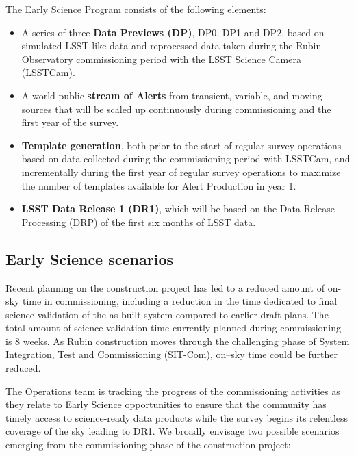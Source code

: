 The Early Science Program consists of the following elements:
\begin{itemize}
	\item A series of three \textbf{Data Previews (DP)}, DP0, DP1 and DP2,  based on simulated LSST-like data and reprocessed data taken during the Rubin Observatory commissioning period with the LSST Science Camera (LSSTCam). 
	\item A world-public \textbf{stream of Alerts} from transient, variable, and moving sources that will be scaled up continuously during commissioning and the first year of the survey. 
	\item  \textbf{Template generation}, both prior to the start of regular survey operations based on data collected during the commissioning period with LSSTCam, and incrementally during the first year of regular survey operations  to maximize the number of templates available for Alert Production in year 1. 
	\item \textbf{LSST Data Release 1 (DR1)}, which will be based on the Data Release Processing (DRP) of the first six months of LSST data.
\end{itemize}


\subsection{Early Science scenarios } \label{ssec:scenarios}

Recent planning on the construction project has led to a reduced amount of on-sky time in commissioning, including a reduction in the time dedicated to final science validation of the as-built system compared to earlier draft plans.
The total amount of science validation time currently planned during commissioning is 8 weeks.
As Rubin construction moves through the challenging phase of System Integration, Test and Commissioning (SIT-Com), on--sky time could be further reduced.

The Operations team is tracking the progress of the commissioning activities as they relate to Early Science opportunities to ensure that the community has timely access to science-ready data products while the survey begins its relentless coverage of the sky leading to DR1.
We broadly envisage two possible scenarios emerging from the commissioning phase of the construction project: 

